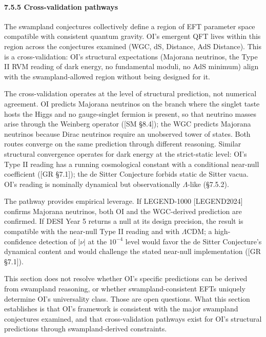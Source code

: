 \documentclass[
]{article}
\begin{document}
\hypertarget{cross-validation-pathways}{%
\paragraph{7.5.5 Cross-validation
pathways}\label{cross-validation-pathways}}

The swampland conjectures collectively define a region of EFT parameter
space compatible with consistent quantum gravity. OI's emergent QFT
lives within this region across the conjectures examined (WGC, dS,
Distance, AdS Distance). This is a cross-validation: OI's structural
expectations (Majorana neutrinos, the Type II RVM reading of dark
energy, no fundamental moduli, no AdS minimum) align with the
swampland-allowed region without being designed for it.

The cross-validation operates at the level of structural prediction, not
numerical agreement. OI predicts Majorana neutrinos on the branch where
the singlet taste hosts the Higgs and no gauge-singlet fermion is
present, so that neutrino masses arise through the Weinberg operator
({[}SM §8.4{]}); the WGC predicts Majorana neutrinos because Dirac
neutrinos require an unobserved tower of states. Both routes converge on
the same prediction through different reasoning. Similar structural
convergence operates for dark energy at the strict-static level: OI's
Type II reading has a running cosmological constant with a conditional
near-null coefficient ({[}GR §7.1{]}); the de Sitter Conjecture forbids
static de Sitter vacua. OI's reading is nominally dynamical but
observationally \(\Lambda\)-like (§7.5.2).

The pathway provides empirical leverage. If LEGEND-1000 {[}LEGEND2024{]}
confirms Majorana neutrinos, both OI and the WGC-derived prediction are
confirmed. If DESI Year 5 returns a null at its design precision, the
result is compatible with the near-null Type II reading and with
\(\Lambda\)CDM; a high-confidence detection of \(|\nu|\) at the
\(10^{-4}\) level would favor the de Sitter Conjecture's dynamical
content and would challenge the stated near-null implementation ({[}GR
§7.1{]}).

This section does not resolve whether OI's specific predictions can be
derived from swampland reasoning, or whether swampland-consistent EFTs
uniquely determine OI's universality class. Those are open questions.
What this section establishes is that OI's framework is consistent with
the major swampland conjectures examined, and that cross-validation
pathways exist for OI's structural predictions through swampland-derived
constraints.
\end{document}
